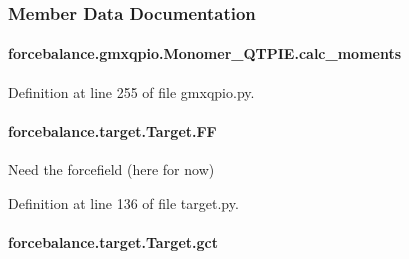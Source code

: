 \subsubsection{Member Data Documentation}
\hypertarget{classforcebalance_1_1gmxqpio_1_1Monomer__QTPIE_a62d13eba40da98dc26bbee9dce8d0d66}{
\paragraph[{calc\-\_\-moments}]{\setlength{\rightskip}{0pt plus 5cm}forcebalance.\-gmxqpio.\-Monomer\-\_\-\-Q\-T\-P\-I\-E.\-calc\-\_\-moments}}\label{classforcebalance_1_1gmxqpio_1_1Monomer__QTPIE_a62d13eba40da98dc26bbee9dce8d0d66}


Definition at line 255 of file gmxqpio.\-py.

\hypertarget{classforcebalance_1_1target_1_1Target_a38a37919783141ea37fdcf8b00ce0aaf}{
\paragraph[{F\-F}]{\setlength{\rightskip}{0pt plus 5cm}forcebalance.\-target.\-Target.\-F\-F\hspace{0.3cm}{\ttfamily [inherited]}}}\label{classforcebalance_1_1target_1_1Target_a38a37919783141ea37fdcf8b00ce0aaf}


Need the forcefield (here for now) 



Definition at line 136 of file target.\-py.

\hypertarget{classforcebalance_1_1target_1_1Target_aa625ac88c6744eb14ef281d9496d0dbb}{
\paragraph[{gct}]{\setlength{\rightskip}{0pt plus 5cm}forcebalance.\-target.\-Target.\-gct\hspace{0.3cm}{\ttfamily [inherited]}}}\label{classforcebalance_1_1target_1_1Target_aa625ac88c6744eb14ef281d9496d0dbb}


